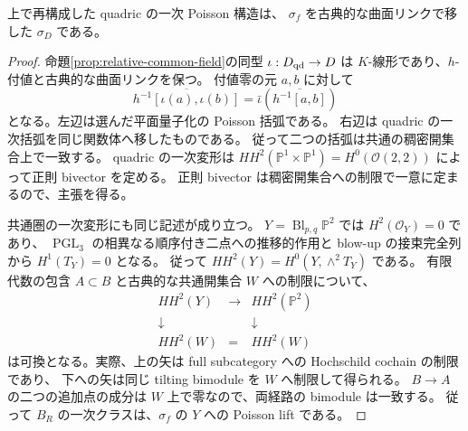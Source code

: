 \begin{proposition}\label{prop:relative-common-poisson}
上で再構成した quadric の一次 Poisson 構造は、
$\sigma_f$ を古典的な曲面リンクで移した $\sigma_D$ である。
\end{proposition}
\begin{proof}
命題\ref{prop:relative-common-field}の同型 $\iota:D_{\rm qd}\to D$ は
$K$-線形であり、$h$-付値と古典的な曲面リンクを保つ。
付値零の元 $a,b$ に対して
\[
 \overline{h^{-1}[\iota(a),\iota(b)]}
 =\bar\iota\!\left(\overline{h^{-1}[a,b]}\right)
 \tag{RG4}
\]
となる。左辺は選んだ平面量子化の Poisson 括弧である。
右辺は quadric の一次括弧を同じ関数体へ移したものである。
従って二つの括弧は共通の稠密開集合上で一致する。
quadric の一次変形は
$HH^2(\mathbb P^1\times\mathbb P^1)=H^0(\mathcal O(2,2))$
によって正則 bivector を定める。
正則 bivector は稠密開集合への制限で一意に定まるので、主張を得る。

共通圏の一次変形にも同じ記述が成り立つ。
$Y=\operatorname{Bl}_{p,q}\mathbb P^2$ では $H^2(\mathcal O_Y)=0$ であり、
$\operatorname{PGL}_3$ の相異なる順序付き二点への推移的作用と
blow-up の接束完全列から $H^1(T_Y)=0$ となる。
従って $HH^2(Y)=H^0(Y,\wedge^2T_Y)$ である。
有限代数の包含 $A\subset B$ と古典的な共通開集合 $W$ への制限について、
\[
 \begin{array}{ccc}
 HH^2(Y)&\longrightarrow&HH^2(\mathbb P^2)\\
 \downarrow&&\downarrow\\
 HH^2(W)&=&HH^2(W)
 \end{array}
\]
は可換となる。実際、上の矢は full subcategory への Hochschild cochain の制限であり、
下への矢は同じ tilting bimodule を $W$ へ制限して得られる。
$B\to A$ の二つの追加点の成分は $W$ 上で零なので、両経路の bimodule は一致する。
従って $B_R$ の一次クラスは、$\sigma_f$ の $Y$ への Poisson lift である。
\end{proof}

